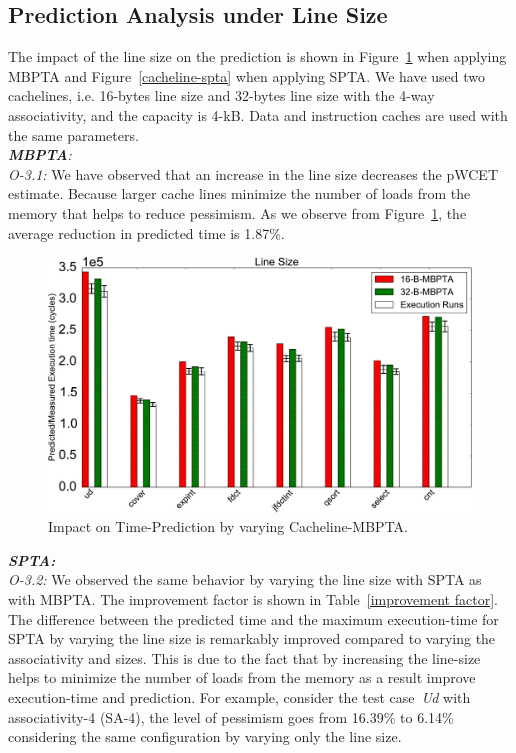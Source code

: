 \subsection{{Prediction Analysis under Line Size}}

The impact of the line size on the prediction is shown in Figure~\ref{cacheline-mbpta} when applying MBPTA and Figure~\ref{cacheline-spta} when applying SPTA. We have used two cachelines, i.e. 16-bytes line size and 32-bytes line size with the 4-way associativity, and the capacity is 4-kB. Data and instruction caches are used with the same parameters. 
\\
\textit{\textbf{MBPTA}:}\\
\textit{O-3.1:} We have observed that an increase in the line size decreases the pWCET estimate. Because larger cache lines minimize the number of loads from the memory that helps to reduce pessimism. As we observe from Figure~\ref{cacheline-mbpta}, the average reduction in predicted time is 1.87\%.

\begin{figure}[tb!]
\centering
\includegraphics[scale=0.4]{figures/cacheline-mbpta.pdf}
\caption{Impact on Time-Prediction by varying
Cacheline-MBPTA.}
\label{cacheline-mbpta}
\end{figure}




\textit{\textbf{SPTA:}}\\
\textit{O-3.2:} We observed the same behavior by varying the line size with SPTA as with MBPTA. The improvement factor is shown in Table~\ref{improvement factor}. The difference between the predicted time and the maximum execution-time for SPTA by varying the line size is remarkably improved compared to varying the associativity and sizes. This is due to the fact that by increasing the line-size helps to minimize the number of loads from the memory as a result improve execution-time and prediction. For example, consider the test case~\textit{Ud} with associativity-4 (SA-4), the level of pessimism goes from 16.39\% to 6.14\% considering the same configuration by varying only the line size. 




